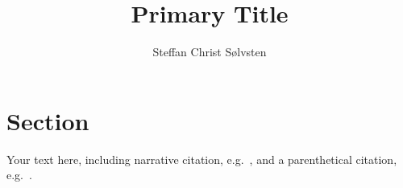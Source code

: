 \documentclass[
    a4paper, %
    stu,     %
]{apa7}
\title{Primary Title}
\author{Steffan Christ S{\o}lvsten}
\affiliation{Department of Computer Science, Aarhus University}
\begin{document}
\maketitle
\section{Section}
Your text here, including narrative citation, e.g.~\textcite{soelvsten2022:TACAS},
and a parenthetical citation, e.g.~\parencite{soelvsten2022:TACAS}.

\printbibliography
\end{document}

